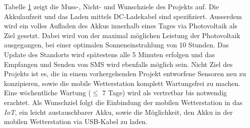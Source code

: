 \begin{landscape}
\begin{table}[htbp]
\begin{tabular}{l|l|l|r|r}
    \bottomrule
    \end{tabular}%
  \label{tab:ZieleP6}%
\end{table}%

Tabelle \ref{tab:ZieleP6} zeigt die Muss-, Nicht- und Wunschziele des Projekts auf. Die Akkulaufzeit und das Laden mittels DC-Ladekabel sind spezifiziert. Ausserdem wird ein volles Aufladen des Akkus innerhalb eines Tages via Photovoltaik als Ziel gesetzt. Dabei wird von der maximal möglichen Leistung der Photovoltaik ausgegangen, bei einer optimalen Sonneneinstrahlung von 10 Stunden. Das Update des Standorts wird spätestens alle 5 Minuten erfolgen und das Empfangen und Senden von SMS wird ebenfalls möglich sein. Nicht Ziel des Projekts ist es, die in einem vorhergehenden Projekt entworfene Sensoren neu zu konzipieren, sowie die mobile Wetterstation komplett Wartungsfrei zu machen. Eine wöchentliche Wartung ($\leq$ 7 Tage) wird als vertretbar bis notwendig erachtet. Als Wunschziel folgt die Einbindung der mobilen Wetterstation in das \textit{IoT}, ein leicht austauschbarer Akku, sowie die Möglichkeit, den Akku in der mobilen Wetterstation via USB-Kabel zu laden.

\end{landscape}
